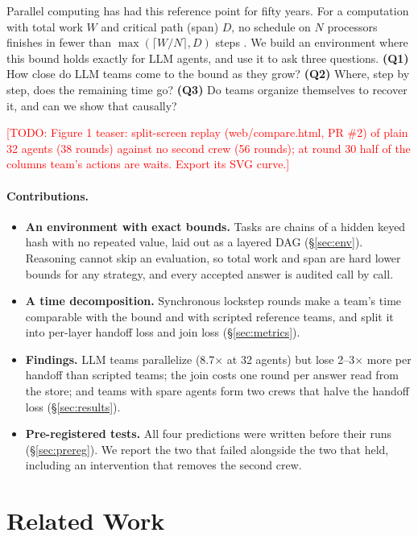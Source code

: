 \documentclass[10pt,twocolumn]{article}
\newcommand{\todo}[1]{\textcolor{red}{[TODO: #1]}}
\begin{document}
Parallel computing has had this reference point for fifty years.
For a computation with total work $W$ and critical path (span) $D$, no schedule on $N$ processors finishes in fewer than $\max(\lceil W/N \rceil, D)$ steps \citep{brent1974,graham1969}.
We build an environment where this bound holds exactly for LLM agents, and use it to ask three questions.
\textbf{(Q1)} How close do LLM teams come to the bound as they grow?
\textbf{(Q2)} Where, step by step, does the remaining time go?
\textbf{(Q3)} Do teams organize themselves to recover it, and can we show that causally?

\todo{Figure 1 teaser: split-screen replay (web/compare.html, PR \#2) of plain 32 agents (38 rounds) against no second crew (56 rounds); at round 30 half of the columns team's actions are waits. Export its SVG curve.}

\paragraph{Contributions.}
\begin{itemize}\setlength\itemsep{1pt}
\item \textbf{An environment with exact bounds.} Tasks are chains of a hidden keyed hash with no repeated value, laid out as a layered DAG (\S\ref{sec:env}). Reasoning cannot skip an evaluation, so total work and span are hard lower bounds for any strategy, and every accepted answer is audited call by call.
\item \textbf{A time decomposition.} Synchronous lockstep rounds make a team's time comparable with the bound and with scripted reference teams, and split it into per-layer handoff loss and join loss (\S\ref{sec:metrics}).
\item \textbf{Findings.} LLM teams parallelize (8.7$\times$ at 32 agents) but lose 2--3$\times$ more per handoff than scripted teams; the join costs one round per answer read from the store; and teams with spare agents form two crews that halve the handoff loss (\S\ref{sec:results}).
\item \textbf{Pre-registered tests.} All four predictions were written before their runs (\S\ref{sec:prereg}). We report the two that failed alongside the two that held, including an intervention that removes the second crew.
\end{itemize}

\section{Related Work}
\end{document}
